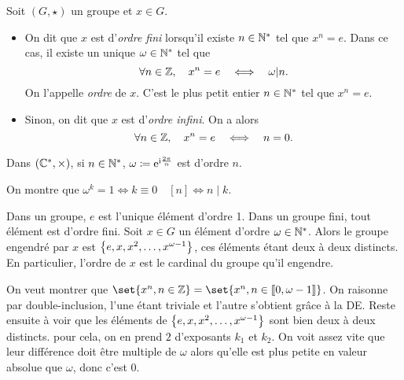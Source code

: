 \documentclass{magnolia}
\begin{document}
\begin{definition}
Soit $(G,\star)$ un groupe et $x\in G$.
\begin{itemize}
\item On dit que $x$ est d'\emph{ordre fini} lorsqu'il existe $n\in{\mathbb{N}^*}$ tel que $x^n=e$.
  Dans ce cas, il existe un unique $\omega\in{\mathbb{N}^*}$ tel que 
  \[\forall n\in\mathbb{Z} ,\quad x^n=e \quad\Longleftrightarrow\quad \omega|n.\]
  On l'appelle \emph{ordre} de $x$. C'est le plus petit entier $n\in{\mathbb{N}^*}$ tel que
  $x^n=e$.
\item Sinon, on dit que $x$ est d'\emph{ordre infini}. On a alors
  \[\forall n\in\mathbb{Z} ,\quad x^n=e \quad\Longleftrightarrow\quad n=0.\]
\end{itemize}
\end{definition}

\begin{remarques}
\remarque Dans
  $(\mathbb{C}^*,\times)$, si $n\in{\mathbb{N}^*}$, $\omega\coloneqq{\rm e}^{{\rm i}\frac{2\pi}{n}}$ est d'ordre
  $n$.
  \begin{sol}
  On montre que $\omega^k=1\Longleftrightarrow k\equiv 0 \quad [n] \Longleftrightarrow n\mid k$.
  \end{sol}
\remarque Dans un groupe, $e$ est l'unique élément d'ordre 1.
\remarque Dans un groupe fini, tout élément est d'ordre fini.
\remarque Soit $x\in G$ un élément d'ordre
  $\omega\in{\mathbb{N}^*}$. Alors le groupe engendré par $x$ est
  $\left\{e,x,x^2,\ldots,x^{\omega-1}\right\}$, ces éléments étant deux à deux distincts. En particulier, l'ordre de $x$ est le
  cardinal du groupe qu'il engendre.
  \begin{sol}
  On veut montrer que $\set{x^n, n\in \Z}=\set{x^n, n\in \intere{0}{\omega-1}}$. On raisonne par double-inclusion, l'une étant triviale et l'autre s'obtient grâce à la DE.
  Reste ensuite à voir que les éléments de $\left\{e,x,x^2,\ldots,x^{\omega-1}\right\}$ sont bien deux à deux distincts. pour cela, on en prend $2$ d'exposants $k_1$ et $k_2$. On voit assez vite que leur différence doit être multiple de $\omega$ alors qu'elle est plus petite en valeur absolue que $\omega$, donc c'est $0$.
  \end{sol}
\end{remarques}
\end{document}
